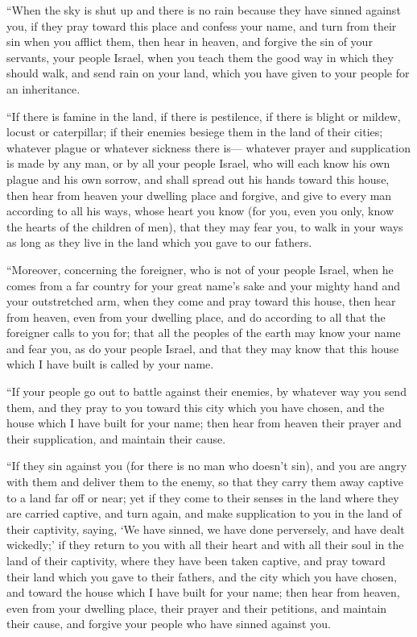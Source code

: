 \myverse{}“When the sky is shut up and there is no rain because they have
sinned against you, if they pray toward this place and confess your name, and turn from their sin when
you afflict them,
\myverse{}then hear in heaven, and forgive the sin of your servants, your people Israel,
when you teach them the good way in which they should walk, and send rain on your land, which you have
given to your people for an inheritance.

\myverse{}“If there is famine in the land, if there is pestilence, if there
is blight or mildew, locust or caterpillar; if their enemies besiege them in the land of their cities;
whatever plague or whatever sickness there is—
\myverse{}whatever prayer and supplication is made by any man, or by all your people
Israel, who will each know his own plague and his own sorrow, and shall spread out his hands toward this
house,
\myverse{}then hear from heaven your dwelling place and forgive, and give to every man
according to all his ways, whose heart you know (for you, even you only, know the hearts of the children
of men),
\myverse{}that they may fear you, to walk in your ways as long as they live in the land
which you gave to our fathers.

\myverse{}“Moreover, concerning the foreigner, who is not of your people
Israel, when he comes from a far country for your great name’s sake and your mighty hand and your outstretched
arm, when they come and pray toward this house,
\myverse{}then hear from heaven, even from your dwelling place, and do according to
all that the foreigner calls to you for; that all the peoples of the earth may know your name and fear
you, as do your people Israel, and that they may know that this house which I have built is called by
your name.

\myverse{}“If your people go out to battle against their enemies, by whatever
way you send them, and they pray to you toward this city which you have chosen, and the house which I
have built for your name;
\myverse{}then hear from heaven their prayer and their supplication, and maintain their
cause.

\myverse{}“If they sin against you (for there is no man who doesn’t sin),
and you are angry with them and deliver them to the enemy, so that they carry them away captive to a land
far off or near;
\myverse{}yet if they come to their senses in the land where they are carried captive,
and turn again, and make supplication to you in the land of their captivity, saying, ‘We have sinned,
we have done perversely, and have dealt wickedly;’
\myverse{}if they return to you with all their heart and with all their soul in the
land of their captivity, where they have been taken captive, and pray toward their land which you gave
to their fathers, and the city which you have chosen, and toward the house which I have built for your
name;
\myverse{}then hear from heaven, even from your dwelling place, their prayer and their
petitions, and maintain their cause, and forgive your people who have sinned against you.

